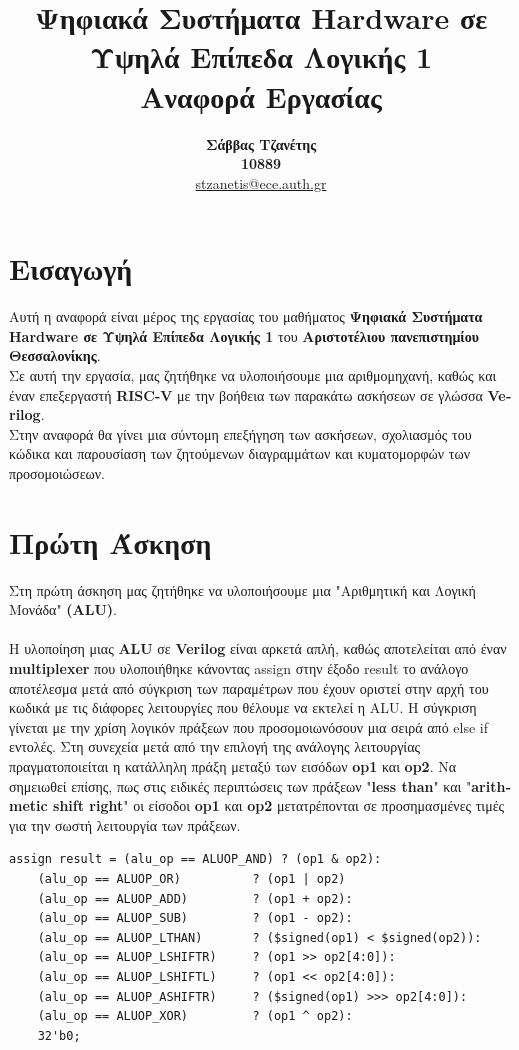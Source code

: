 \documentclass[a4paper,12pt]{report}
\def\tl{\textlatin}
\begin{document}
\title{\textbf{Ψηφιακά Συστήματα \tl{Hardware} σε Υψηλά Επίπεδα Λογικής 1} \\ Αναφορά Εργασίας}
\author{\textbf{Σάββας Τζανέτης} \\
\textbf{10889} \\
\href{mailto:empty@auth.gr}{\tl{stzanetis@ece.auth.gr}}}
\maketitle

\chapter*{Εισαγωγή}
    \large Αυτή η αναφορά είναι μέρος της εργασίας του μαθήματος \textbf{Ψηφιακά Συστήματα \tl{Hardware} σε Υψηλά Επίπεδα Λογικής 1} του \textbf{Αριστοτέλιου πανεπιστημίου Θεσσαλονίκης}. \\
    Σε αυτή την εργασία, μας ζητήθηκε να υλοποιήσουμε μια αριθμομηχανή, καθώς και έναν επεξεργαστή \textbf{\tl{RISC-V}} με την βοήθεια των παρακάτω ασκήσεων σε γλώσσα \textbf{\tl{Verilog}}. \\
    Στην αναφορά θα γίνει μια σύντομη επεξήγηση των ασκήσεων, σχολιασμός του κώδικα και παρουσίαση των ζητούμενων διαγραμμάτων και κυματομορφών των προσομοιώσεων.
\chapter{Πρώτη Άσκηση}
    \large Στη πρώτη άσκηση μας ζητήθηκε να υλοποιήσουμε μια "Αριθμητική και Λογική Μονάδα" \textbf{\tl{(ALU)}}. \\ \\
    Η υλοποίηση μιας \textbf{\tl{ALU}} σε \textbf{\tl{Verilog}} είναι αρκετά απλή, καθώς αποτελείται από έναν \textbf{\tl{multiplexer}} που υλοποιήθηκε κάνοντας \tl{assign} στην έξοδο \tl{result} το ανάλογο αποτέλεσμα μετά από σύγκριση των παραμέτρων που έχουν οριστεί στην αρχή του κωδικά με τις διάφορες λειτουργίες που θέλουμε να εκτελεί η \tl{ALU}. Η σύγκριση γίνεται με την χρίση λογικόν πράξεων που προσομοιωνόσουν μια σειρά από \tl{else if} εντολές. Στη συνεχεία μετά από την επιλογή της ανάλογης λειτουργίας πραγματοποιείται η κατάλληλη πράξη μεταξύ των εισόδων \textbf{\tl{op1}} και \textbf{\tl{op2}}. Να σημειωθεί επίσης, πως στις ειδικές περιπτώσεις των πράξεων "\textbf{\tl{less than}}" και "\textbf{\tl{arithmetic shift right}}" οι είσοδοι \textbf{\tl{op1}} και \textbf{\tl{op2}} μετατρέπονται σε προσημασμένες τιμές για την σωστή λειτουργία των πράξεων.
    \vspace{1cm}
    \begin{lstlisting}[style=verilog]
assign result = (alu_op == ALUOP_AND) ? (op1 & op2):
    (alu_op == ALUOP_OR)          ? (op1 | op2)
    (alu_op == ALUOP_ADD)         ? (op1 + op2):
    (alu_op == ALUOP_SUB)         ? (op1 - op2):
    (alu_op == ALUOP_LTHAN)       ? ($signed(op1) < $signed(op2)):
    (alu_op == ALUOP_LSHIFTR)     ? (op1 >> op2[4:0]):
    (alu_op == ALUOP_LSHIFTL)     ? (op1 << op2[4:0]):
    (alu_op == ALUOP_ASHIFTR)     ? ($signed(op1) >>> op2[4:0]):
    (alu_op == ALUOP_XOR)         ? (op1 ^ op2):
    32'b0;  
    \end{lstlisting}
\end{document}
